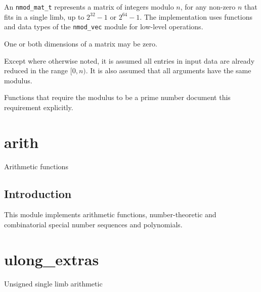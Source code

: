 \documentclass[a4paper,10pt]{book}
\newcommand{\code}{\lstinline}
\begin{document}
An \code{nmod_mat_t} represents a matrix of integers modulo $n$, for any 
non-zero $n$ that fits in a single limb, up to $2^{32}-1$ or $2^{64}-1$. The
implementation uses functions and data types of the \code{nmod_vec} module
for low-level operations.

One or both dimensions of a matrix may be zero.

Except where otherwise noted, it is assumed all entries in input
data are already reduced in the range $[0, n)$. It is also assumed that
all arguments have the same modulus.

Functions that require the modulus to be a prime number document this
requirement explicitly.




\chapter{arith}
\epigraph{Arithmetic functions}{}

\section{Introduction}

This module implements arithmetic functions, number-theoretic and 
combinatorial special number sequences and polynomials.




\chapter{ulong\_extras}
\epigraph{Unsigned single limb arithmetic}{}



\end{document}
